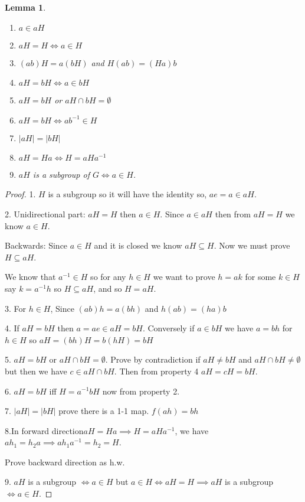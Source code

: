 \documentclass[oneside,11pt,pdftex]{book}%
\numberwithin{equation}{section}
\newtheorem{lemma}[theorem]{Lemma}
\numberwithin{section}{chapter}
\numberwithin{equation}{chapter}
\begin{document}
\begin{lemma}
	\begin{enumerate}
		\item $ a \in aH $
		\item $ aH = H \iff a \in H $
		\item $ (ab)H=a(bH) $ and $ H(ab)=(Ha)b $
		\item $ aH = bH \iff a \in bH $
		\item $ aH=bH $ or $ aH \cap bH = \emptyset $
		\item $ aH=bH \iff ab^{-1} \in H $
		\item $ |aH|=|bH| $
		\item $ aH=Ha \iff H=aHa^{-1} $
		\item $ aH $ is a subgroup of $ G \iff a \in H $.
	\end{enumerate}
\end{lemma}
\begin{proof}
	1. $ H $ is a subgroup so it will have the identity so, $ ae=a\in aH $.
	
	2. Unidirectional part: $ aH=H $ then $ a \in H $. Since $ a \in aH $ then from $ aH=H $ we know $ a \in H $.
	
	Backwards: Since $ a\in H $ and it is closed we know $ aH \subseteq H $. Now we must prove $ H \subseteq aH $. 
	
	We know that $ a^{-1}\in H $ so for any $ h \in H $ we want to prove $ h=ak $ for some $ k\in H $ say $ k=a^{-1}h $ so $ H \subseteq aH $, and so $ H=aH $.
	
	3. For $ h\in H$, Since $ (ab)h=a(bh) $ and $ h(ab)=(ha)b $
	
	4. If $ aH=bH $ then $ a=ae \in aH=bH $. Conversely if $ a \in bH $ we have $ a=bh $ for $ h\in H $ so $ aH=(bh)H=b(hH)=bH$
	
	5. $ aH=bH $ or $ aH \cap bH = \emptyset $. Prove by contradiction if $ aH \neq bH $ and $ aH \cap bH \neq \emptyset $ but then we have $ c \in aH \cap bH $. Then from property 4 $ aH=cH=bH $.
	
	6. $ aH=bH $ iff $ H=a^{-1}bH $ now from property 2.
	
	7. $ |aH|=|bH| $ prove there is a 1-1 map.
	$ f(ah)=bh $
	
	8.In forward direction$ aH=Ha \implies H=aHa^{-1}$, we have $ ah_1=h_2a \implies ah_1a^{-1}=h_2 =H$.
	
	Prove backward direction as h.w.
	
	9. $ aH $ is a subgroup $ \iff a \in H $ but $ a\in H \iff aH=H \implies aH$ is a subgroup $ \iff a\in H $.
\end{proof}
\end{document}
